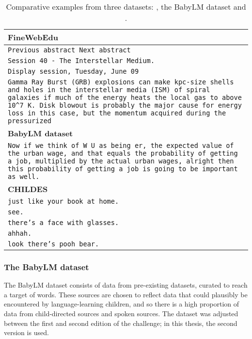 \begin{table}[t]
    \centering
    \footnotesize
    \begin{tabular}{p{}}
        \toprule
        \textbf{FineWebEdu} \\
        \midrule
        \texttt{Previous abstract Next abstract} \\
        \texttt{Session 40 - The Interstellar Medium.} \\
        \texttt{Display session, Tuesday, June 09} \\
        \texttt{Gamma Ray Burst (GRB) explosions can make kpc-size shells and holes in the interstellar media (ISM) of spiral galaxies if much of the energy heats the local gas to above 10\^{}7 K. Disk blowout is probably the major cause for energy loss in this case, but the momentum acquired during the pressurized} \\
        \midrule
        \textbf{BabyLM dataset} \\
        \midrule
        \texttt{Now if we think of W U as being er, the expected value of the urban wage, and that equals the probability of getting a job, multiplied by the actual urban wages, alright then this probability of getting a job is going to be important as well.} \\
        \midrule
        \textbf{CHILDES} \\
        \midrule
        \texttt{just like your book at home.} \\
        \texttt{see.} \\
        \texttt{there's a face with glasses.} \\
        \texttt{ahhah.} \\
        \texttt{look there's pooh bear.} \\
        \bottomrule   
    \end{tabular}
    \caption{Comparative examples from three datasets: \fineweb, the BabyLM dataset and \childes.}
    \label{tab:12-datasetexamples}
\end{table}

\subsubsection{The BabyLM dataset}\label{sec:12-babylmdataset}

The BabyLM dataset consists of data from pre-existing datasets, curated to reach a target of  words. These sources are chosen to reflect data that could plausibly be encountered by language-learning children, and so there is a high proportion of data from child-directed sources and spoken sources. The dataset was adjusted between the first and second edition of the challenge; in this thesis, the second version is used. 

